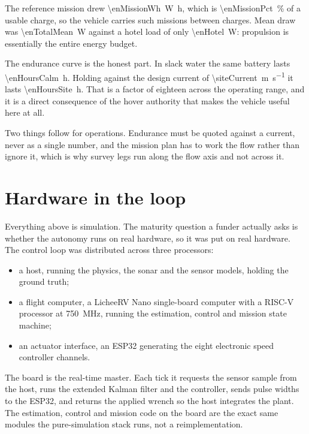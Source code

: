 \documentclass[10pt,a4paper]{article}
\begin{document}
The reference mission drew \SI{\enMissionWh}{\watt\hour}, which is
\SI{\enMissionPct}{\percent} of a usable charge, so the vehicle carries
\enMissions{} such missions between charges. Mean draw was
\SI{\enTotalMean}{\watt} against a hotel load of only
\SI{\enHotel}{\watt}: propulsion is essentially the entire energy budget.

The endurance curve is the honest part. In slack water the same battery lasts
\SI{\enHoursCalm}{\hour}. Holding against the design current of
\SI{\siteCurrent}{\metre\per\second} it lasts \SI{\enHoursSite}{\hour}. That is
a factor of eighteen across the operating range, and it is a direct consequence
of the hover authority that makes the vehicle useful here at all.

Two things follow for operations. Endurance must be quoted against a current,
never as a single number, and the mission plan has to work the flow rather than
ignore it, which is why survey legs run along the flow axis and not across it.

\section{Hardware in the loop}\label{sec:hil}

Everything above is simulation. The maturity question a funder actually asks is
whether the autonomy runs on real hardware, so it was put on real hardware. The
control loop was distributed across three processors:

\begin{itemize}[leftmargin=*,itemsep=2pt]
\item a host, running the physics, the sonar and the sensor models, holding the
ground truth;
\item a flight computer, a LicheeRV Nano single-board computer with a RISC-V
processor at \SI{750}{\mega\hertz}, running the estimation, control and mission
state machine;
\item an actuator interface, an ESP32 generating the eight electronic speed
controller channels.
\end{itemize}

The board is the real-time master. Each tick it requests the sensor sample from
the host, runs the extended Kalman filter and the controller, sends pulse
widths to the ESP32, and returns the applied wrench so the host integrates the
plant. The estimation, control and mission code on the board are the exact same
modules the pure-simulation stack runs, not a reimplementation.
\end{document}
